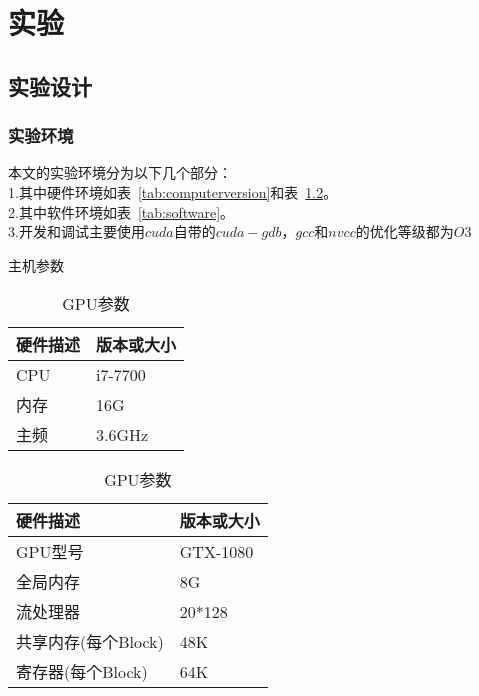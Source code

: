 \chapter{实验}
\label{cha:expriment}



\section{实验设计}
\subsection{实验环境}
本文的实验环境分为以下几个部分：\\
1.其中硬件环境如表~\ref{tab:computerversion}和表~\ref{tab:gpuversion}。\\
2.其中软件环境如表~\ref{tab:software}。\\
3.开发和调试主要使用$cuda$自带的$cuda-gdb$，$gcc$和$nvcc$的优化等级都为$O3$
\begin{table}[htbp]
	\noindent
	\begin{minipage}{0.5\textwidth}
		\centering
		\caption{主机参数}
		\label{tab:computerversion}
		\begin{tabular}{p{2cm}p{2cm}}
			\toprule[1.5pt]
			硬件描述 & 版本或大小 \\
			\midrule[1pt]
			CPU & i7-7700 \\
			内存 & 16G  \\
			主频 & 3.6GHz  \\
			\bottomrule[1.5pt]
		\end{tabular}
	\end{minipage}%
	\noindent
	\begin{minipage}{0.5\textwidth}
		\centering
		\caption{GPU参数}
		\label{tab:gpuversion}
		\begin{tabular}{p{4cm}p{2cm}}
			\toprule[1.5pt]
			硬件描述 & 版本或大小 \\
			\midrule[1pt]
			GPU型号 & GTX-1080 \\
			全局内存 & 8G \\
			流处理器 & 20*128 \\
			共享内存(每个Block) & 48K \\
			寄存器(每个Block) & 64K \\
			\bottomrule[1.5pt]
		\end{tabular}
	\end{minipage}
\end{table}

